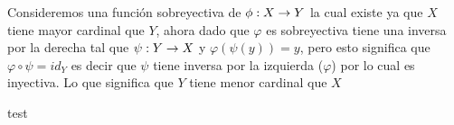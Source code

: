 \documentclass{homework}
\begin{document}
\parte
Consideremos una función sobreyectiva de \(\phi: X \to Y\) la cual existe ya que \(X\) tiene mayor cardinal
que \(Y\), ahora dado que \(\varphi\) es sobreyectiva tiene una inversa por la derecha tal que \(\psi: Y \to X\)
y \(\varphi(\psi(y)) = y\), pero esto significa que \(\varphi \circ \psi = id_Y\) es decir que \(\psi\) tiene inversa
por la izquierda (\(\varphi\)) por lo cual es inyectiva. Lo que significa que \(Y\) tiene menor cardinal que \(X\)


\question test
\label{sec:org08c61ec}
\parte
\end{document}
